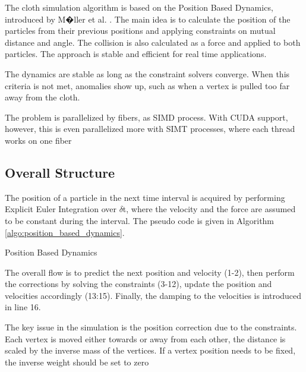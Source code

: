 The cloth simulation algorithm is based on the Position Based Dynamics, introduced by M�ller et al. \cite{Muller2007}. The main idea is to calculate the position of the particles from their previous positions and applying constraints on mutual distance and angle. The collision is also calculated as a force and applied to both particles. The approach is stable and efficient for real time applications.

The dynamics are stable as long as the constraint solvers converge. When this criteria is not met, anomalies show up, such as when a vertex is pulled too far away from the cloth. 

The problem is parallelized by fibers, as SIMD process. With CUDA support, however, this is even parallelized more with SIMT processes, where each thread works on one fiber

\subsection{Overall Structure}
The position of a particle in the next time interval is acquired by performing
Explicit Euler Integration over $\delta$t, where the velocity and the force are
assumed to be constant during the interval. The pseudo code is given  in
Algorithm \ref{algo:position_based_dynamics}.

\begin{algorithm}
\dontprintsemicolon %
\caption{Position Based Dynamics}
\label{algo:position_based_dynamics}
\end{algorithm}

The overall flow is to predict the next position and velocity (1-2), then
perform the corrections by solving the constraints (3-12), update the position
and velocities accordingly (13:15). Finally, the damping to the velocities is
introduced in line 16.

The key issue in the simulation is the position correction due to the constraints. Each vertex is moved either towards or away from each other, the distance is scaled by the inverse mass of the vertices. If a vertex position needs to be fixed, the inverse weight should be set to zero


